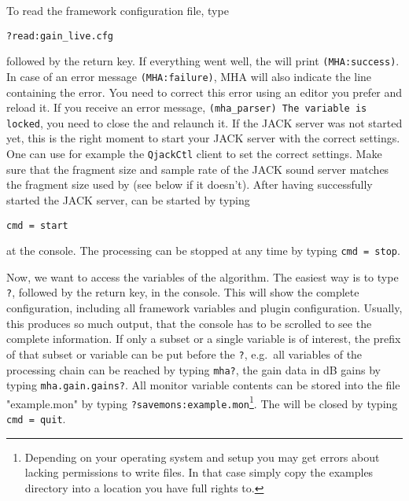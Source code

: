 To read the framework configuration file, type
\begin{verbatim}
?read:gain_live.cfg
\end{verbatim}
followed by the return key. If everything went well, the \mha{} will print
\verb!(MHA:success)!. In case of an error message \verb!(MHA:failure)!, MHA 
will also indicate the line containing the error. You need to correct this 
error using an editor you prefer and  reload it. If you receive an error 
message, \verb!(mha_parser) The variable is locked!, you need to close the 
\mhad{} and relaunch it. If the JACK server was not started yet, this is the
right moment to start your JACK server with the correct settings. One can use 
for example the \verb!QjackCtl! client to set the correct settings.
Make sure that the fragment size and sample rate of the JACK
sound server matches the fragment size used by \mha{} (see below if it
doesn't). After having successfully started the JACK server, \mha{}
can be started by typing
\begin{verbatim}
cmd = start
\end{verbatim}
at the \mha{} console. The processing can be stopped at any time by
typing \verb!cmd = stop!.

Now, we want to access the variables of the algorithm. The easiest way
is to type \verb!?!, followed by the return key, in the console. This
will show the complete \mha{} configuration, including all framework
variables and plugin configuration. Usually, this
produces so much output, that the console has to be scrolled to see
the complete information. If only a subset or a single variable is of
interest, the prefix of that subset or variable can be put before the
\verb!?!, e.g.\ all variables of the processing chain can be reached
by typing \newline\verb!mha?!, the gain data in dB gains
by typing \newline\verb!mha.gain.gains?!. All monitor variable contents can
be stored into the file "example.mon" by typing
\verb!?savemons:example.mon!\footnote{Depending on your operating
  system and setup you may get errors about lacking permissions to write files.
  In that case simply copy the examples directory into a location you have full
  rights to.}. The \mhad{} will be closed
by typing \verb!cmd = quit!.

